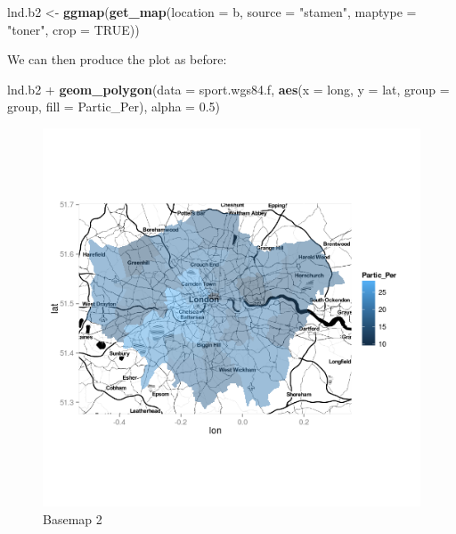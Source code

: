 \documentclass[]{article}
\newenvironment{Shaded}{}{}
\newcommand{\KeywordTok}[1]{\textcolor[rgb]{0.00,0.44,0.13}{\textbf{{#1}}}}
\newcommand{\DataTypeTok}[1]{\textcolor[rgb]{0.56,0.13,0.00}{{#1}}}
\newcommand{\FloatTok}[1]{\textcolor[rgb]{0.25,0.63,0.44}{{#1}}}
\newcommand{\StringTok}[1]{\textcolor[rgb]{0.25,0.44,0.63}{{#1}}}
\newcommand{\OtherTok}[1]{\textcolor[rgb]{0.00,0.44,0.13}{{#1}}}
\newcommand{\NormalTok}[1]{{#1}}
\begin{document}
\begin{Shaded}
\begin{Highlighting}[]
\NormalTok{lnd.b2 <-}\StringTok{ }\KeywordTok{ggmap}\NormalTok{(}\KeywordTok{get_map}\NormalTok{(}\DataTypeTok{location =} \NormalTok{b, }\DataTypeTok{source =} \StringTok{"stamen"}\NormalTok{, }\DataTypeTok{maptype =} \StringTok{"toner"}\NormalTok{, }
    \DataTypeTok{crop =} \OtherTok{TRUE}\NormalTok{))}
\end{Highlighting}
\end{Shaded}

We can then produce the plot as before:

\begin{Shaded}
\begin{Highlighting}[]
\NormalTok{lnd.b2 +}\StringTok{ }\KeywordTok{geom_polygon}\NormalTok{(}\DataTypeTok{data =} \NormalTok{sport.wgs84.f, }\KeywordTok{aes}\NormalTok{(}\DataTypeTok{x =} \NormalTok{long, }\DataTypeTok{y =} \NormalTok{lat, }\DataTypeTok{group =} \NormalTok{group, }
    \DataTypeTok{fill =} \NormalTok{Partic_Per), }\DataTypeTok{alpha =} \FloatTok{0.5}\NormalTok{)}
\end{Highlighting}
\end{Shaded}

\begin{figure}[htbp]
\centering
\includegraphics{figure/Basemap_2.png}
\caption{Basemap 2}
\end{figure}
\end{document}
